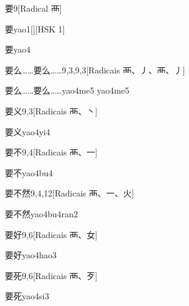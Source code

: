 \begin{entry}{要}{9}[Radical ⾑]
  \begin{phonetics}{要}{yao1}[][HSK 1]
  \end{phonetics}
  \begin{phonetics}{要}{yao4}
  \end{phonetics}
\end{entry}

\begin{entry}{要么……要么……}{9,3,9,3}[Radicais ⾑、⼃、⾑、⼃]
  \begin{phonetics}{要么……要么……}{yao4me5 yao4me5}
  \end{phonetics}
\end{entry}

\begin{entry}{要义}{9,3}[Radicais ⾑、⼂]
  \begin{phonetics}{要义}{yao4yi4}
  \end{phonetics}
\end{entry}

\begin{entry}{要不}{9,4}[Radicais ⾑、⼀]
  \begin{phonetics}{要不}{yao4bu4}
  \end{phonetics}
\end{entry}

\begin{entry}{要不然}{9,4,12}[Radicais ⾑、⼀、⽕]
  \begin{phonetics}{要不然}{yao4bu4ran2}
  \end{phonetics}
\end{entry}

\begin{entry}{要好}{9,6}[Radicais ⾑、⼥]
  \begin{phonetics}{要好}{yao4hao3}
  \end{phonetics}
\end{entry}

\begin{entry}{要死}{9,6}[Radicais ⾑、⽍]
  \begin{phonetics}{要死}{yao4si3}
  \end{phonetics}
\end{entry}

